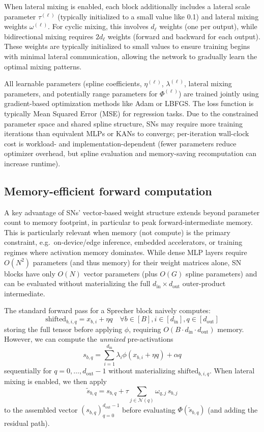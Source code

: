 \documentclass{article}
\theoremstyle{plain}
\theoremstyle{definition}
\theoremstyle{remark}
\begin{document}
When lateral mixing is enabled, each block additionally includes a lateral scale parameter $\tau^{(\ell)}$ (typically initialized to a small value like 0.1) and lateral mixing weights $\omega^{(\ell)}$. For cyclic mixing, this involves $d_\ell$ weights (one per output), while bidirectional mixing requires $2d_\ell$ weights (forward and backward for each output). These weights are typically initialized to small values to ensure training begins with minimal lateral communication, allowing the network to gradually learn the optimal mixing patterns.

All learnable parameters (spline coefficients, $\eta^{(\ell)}$, $\lambda^{(\ell)}$, lateral mixing parameters, and potentially range parameters for $\Phi^{(\ell)}$) are trained jointly using gradient-based optimization methods like Adam \cite{kingma2014adam} or LBFGS. The loss function is typically Mean Squared Error (MSE) for regression tasks. Due to the constrained parameter space and shared spline structure, SNs may require more training iterations than equivalent MLPs or KANs to converge; per-iteration wall-clock cost is workload- and implementation-dependent (fewer parameters reduce optimizer overhead, but spline evaluation and memory-saving recomputation can increase runtime).

\subsection{Memory-efficient forward computation}
\label{sec:memory_efficient}

A key advantage of SNs' vector-based weight structure extends beyond parameter count to memory footprint, in particular to peak forward-intermediate memory. This is particularly relevant when memory (not compute) is the primary constraint, e.g.\ on-device/edge inference, embedded accelerators, or training regimes where activation memory dominates. While dense MLP layers require $O(N^2)$ parameters (and thus memory) for their weight matrices alone, SN blocks have only $O(N)$ vector parameters (plus $O(G)$ spline parameters) and can be evaluated without materializing the full $d_{\mathrm{in}}\times d_{\mathrm{out}}$ outer-product intermediate.

The standard forward pass for a Sprecher block naively computes:
$$\text{shifted}_{b,i,q} = x_{b,i} + \eta q \quad \forall b \in [B], i \in [d_{\mathrm{in}}], q \in [d_{\mathrm{out}}]$$
storing the full tensor before applying $\phi$, requiring $O(B \cdot d_{\mathrm{in}} \cdot d_{\mathrm{out}})$ memory. However, we can compute the \emph{unmixed} pre-activations
$$s_{b,q} = \sum_{i=1}^{d_{\mathrm{in}}} \lambda_i \phi(x_{b,i} + \eta q) + \alpha q$$
sequentially for $q = 0, \ldots, d_{\mathrm{out}}-1$ without materializing $\text{shifted}_{b,i,q}$. When lateral mixing is enabled, we then apply
$$\tilde{s}_{b,q} = s_{b,q} + \tau \sum_{j\in \mathcal{N}(q)} \omega_{q,j}\, s_{b,j}$$
to the assembled vector $(s_{b,q})_{q=0}^{d_{\mathrm{out}}-1}$ before evaluating $\Phi(\tilde{s}_{b,q})$ (and adding the residual path).
\end{document}

